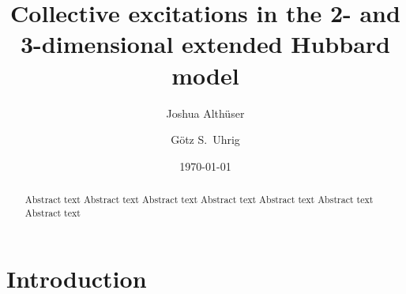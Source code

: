 \documentclass[
    reprint, 
    aps,
    preprintnumbers,
    twocolumn,
    prb,
    superscriptaddress
]{revtex4-2}
\begin{document}
 

\title{Collective excitations in the 2- and 3-dimensional extended Hubbard model}


\author{Joshua Alth\"user}

\author{G\"otz S.~Uhrig}

\date{\today}

\begin{abstract}
Abstract text Abstract text Abstract text Abstract text Abstract text Abstract text Abstract text 
\end{abstract}

\maketitle


\section{Introduction}\label{sec:introduction}
\end{document}
